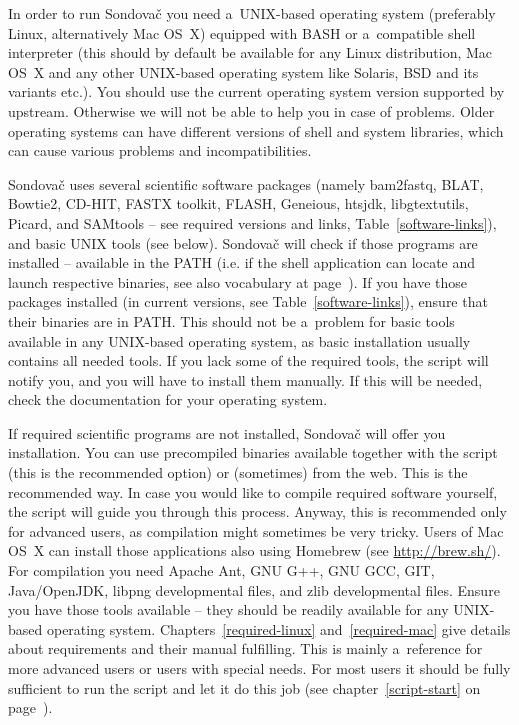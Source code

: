\documentclass[a4paper, 11pt, twoside]{article}
\begin{document}
In order to run Sondovač you need a~UNIX-based operating system (preferably Linux, alternatively Mac OS~X) equipped with BASH or a~compatible shell interpreter (this should by default be available for any Linux distribution, Mac OS~X and any other UNIX-based operating system like Solaris, BSD and its variants etc.). You should use the current operating system version supported by upstream. Otherwise we will not be able to help you in case of problems. Older operating systems can have different versions of shell and system libraries, which can cause various problems and incompatibilities.

Sondovač uses several scientific software packages (namely bam2fastq, BLAT, Bowtie2, CD-HIT, FASTX toolkit, FLASH, Geneious, htsjdk, libgtextutils, Picard, and SAMtools -- see required versions and links, Table~\ref{software-links}), and basic UNIX tools (see below). Sondovač will check if those programs are installed -- available in the PATH (i.e. if the shell application can locate and launch respective binaries, see also vocabulary at page~\pageref{vocabulary}). If you have those packages installed (in current versions, see Table~\ref{software-links}), ensure that their binaries are in PATH. This should not be a~problem for basic tools available in any UNIX-based operating system, as basic installation usually contains all needed tools. If you lack some of the required tools, the script will notify you, and you will have to install them manually. If this will be needed, check the documentation for your operating system. %

If required scientific programs are not installed, Sondovač will offer you installation. You can use precompiled binaries available together with the script (this is the recommended option) or (sometimes) from the web. This is the recommended way. In case you would like to compile required software yourself, the script will guide you through this process. Anyway, this is recommended only for advanced users, as compilation might sometimes be very tricky. Users of Mac OS~X can install those applications also using Homebrew (see \url{http://brew.sh/}). For compilation you need Apache Ant, GNU G++, GNU GCC, GIT, Java/OpenJDK, libpng developmental files, and zlib developmental files. Ensure you have those tools available -- they should be readily available for any UNIX-based operating system. Chapters~\ref{required-linux} and~\ref{required-mac} give details about requirements and their manual fulfilling. This is mainly a~reference for more advanced users or users with special needs. For most users it should be fully sufficient to run the script and let it do this job (see chapter~\ref{script-start} on page~\pageref{script-usage}).
\end{document}
